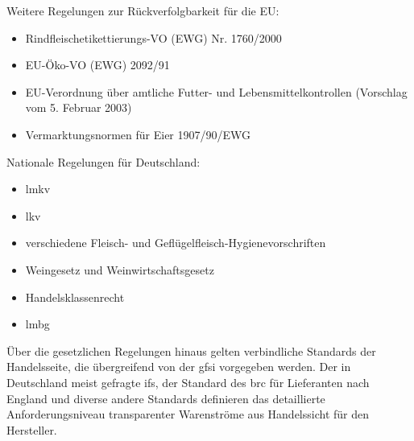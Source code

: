 \noindent
Weitere Regelungen zur Rückverfolgbarkeit für die EU:
\begin{itemize}
  \item Rindfleischetikettierungs-VO (EWG) Nr. 1760/2000
  \item EU-Öko-VO (EWG) 2092/91
  \item EU-Verordnung über amtliche Futter- und Lebensmittelkontrollen (Vorschlag vom 5. Februar 2003)
  \item Vermarktungsnormen für Eier 1907/90/EWG
\end{itemize}
Nationale Regelungen für Deutschland:
\begin{itemize}
  \item \acf{lmkv}
  \item \acf{lkv}
  \item verschiedene Fleisch- und Geflügelfleisch-Hygienevorschriften
  \item Weingesetz und Weinwirtschaftsgesetz
  \item Handelsklassenrecht
  \item \acf{lmbg}
\end{itemize}
Über die gesetzlichen Regelungen hinaus gelten verbindliche Standards der Handelsseite, die übergreifend von der \ac{gfsi} vorgegeben werden. Der in Deutschland meist gefragte \ac{ifs}, der Standard des \ac{brc} für Lieferanten nach England und diverse andere Standards definieren das detaillierte Anforderungsniveau transparenter Warenströme aus Handelssicht für den Hersteller.

